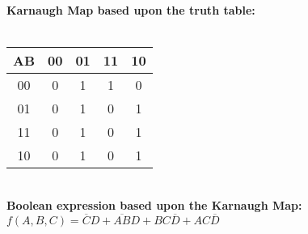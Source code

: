 \documentclass[12pt]{article}
\begin{document}
\begin{center}
		\textbf{Karnaugh Map based upon the truth table: } \vspace{.2cm}  \\
		
		\ \ \ \ \ \ \  \\
		
		\begin{tabular}{ |c|c|c|c|c| } 
			
			\hline
			
			AB  & 00 & 01 & 11 & 10 \\
			\hline
			00  & 0  &  1 & 1  & 0  \\
			\hline
			01  & 0  &  1 & 0  & 1  \\
			\hline
			11  & 0  &  1 & 0  & 1  \\
			\hline
			10  & 0  &  1 & 0  & 1  \\
			\hline
			
			
		\end{tabular} \vspace{0.6cm} \\
		
		\textbf{Boolean expression based upon the Karnaugh Map: } \vspace{.2cm} \\
		$f(A, B, C) = \overline{C}D + \overline{AB}D + BC\overline{D} + AC\overline{D}$  \vspace{0.5cm} \\
		
		
		
	
	
	
		
		
	\end{center}
	
\end{document}
